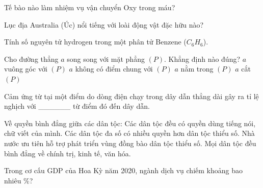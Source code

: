 \begin{ex}
    Tế bào nào làm nhiệm vụ vận chuyển Oxy trong máu?
\end{ex}

\begin{ex}
    Lục địa Australia (Úc) nổi tiếng với loài động vật đặc hữu nào?

\end{ex}

\begin{ex}
    Tính số nguyên tử hydrogen trong một phân tử Benzene ($C_6H_6$).
\end{ex}

\begin{ex}
    Cho đường thẳng $a$ song song với mặt phẳng $(P)$. Khẳng định nào đúng?
    \choice
    {$a$ vuông góc với $(P)$}
    {\True $a$ không có điểm chung với $(P)$}
    {$a$ nằm trong $(P)$}
    {$a$ cắt $(P)$}
\end{ex}

\begin{ex}
    Cảm ứng từ tại một điểm do dòng điện chạy trong dây dẫn thẳng dài gây ra tỉ lệ nghịch với ______ từ điểm đó đến dây dẫn.

\end{ex}

\begin{ex}
    Về quyền bình đẳng giữa các dân tộc:
    \choiceTF
    {\True Các dân tộc đều có quyền dùng tiếng nói, chữ viết của mình.}
    {Các dân tộc đa số có nhiều quyền hơn dân tộc thiểu số.}
    {\True Nhà nước ưu tiên hỗ trợ phát triển vùng đồng bào dân tộc thiểu số.}
    {\True Mọi dân tộc đều bình đẳng về chính trị, kinh tế, văn hóa.}
    \loigiai{
        \begin{itemchoice}
        \itemch 
        \itemch 
        \itemch 
        \itemch 
        \end{itemchoice}
    }
\end{ex}

\begin{ex}
    Trong cơ cấu GDP của Hoa Kỳ năm 2020, ngành dịch vụ chiếm khoảng bao nhiêu \%?
\end{ex}

